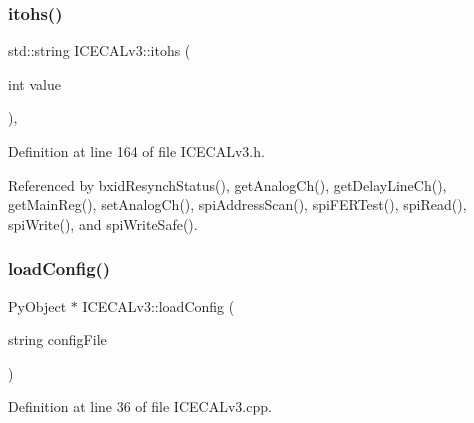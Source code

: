 \subsubsection{\texorpdfstring{itohs()}{itohs()}}
{\footnotesize\ttfamily std\+::string I\+C\+E\+C\+A\+Lv3\+::itohs (\begin{DoxyParamCaption}\item[{int}]{value }\end{DoxyParamCaption})\hspace{0.3cm}{\ttfamily [inline]}, {\ttfamily [private]}}



Definition at line 164 of file I\+C\+E\+C\+A\+Lv3.\+h.



Referenced by bxid\+Resynch\+Status(), get\+Analog\+Ch(), get\+Delay\+Line\+Ch(), get\+Main\+Reg(), set\+Analog\+Ch(), spi\+Address\+Scan(), spi\+F\+E\+R\+Test(), spi\+Read(), spi\+Write(), and spi\+Write\+Safe().


\mbox{\label{classICECALv3_a514456dd303e897aa1b55dccf3fa66d0}} 
\subsubsection{\texorpdfstring{load\+Config()}{loadConfig()}}
{\footnotesize\ttfamily Py\+Object $\ast$ I\+C\+E\+C\+A\+Lv3\+::load\+Config (\begin{DoxyParamCaption}\item[{string}]{config\+File }\end{DoxyParamCaption})}



Definition at line 36 of file I\+C\+E\+C\+A\+Lv3.\+cpp.



